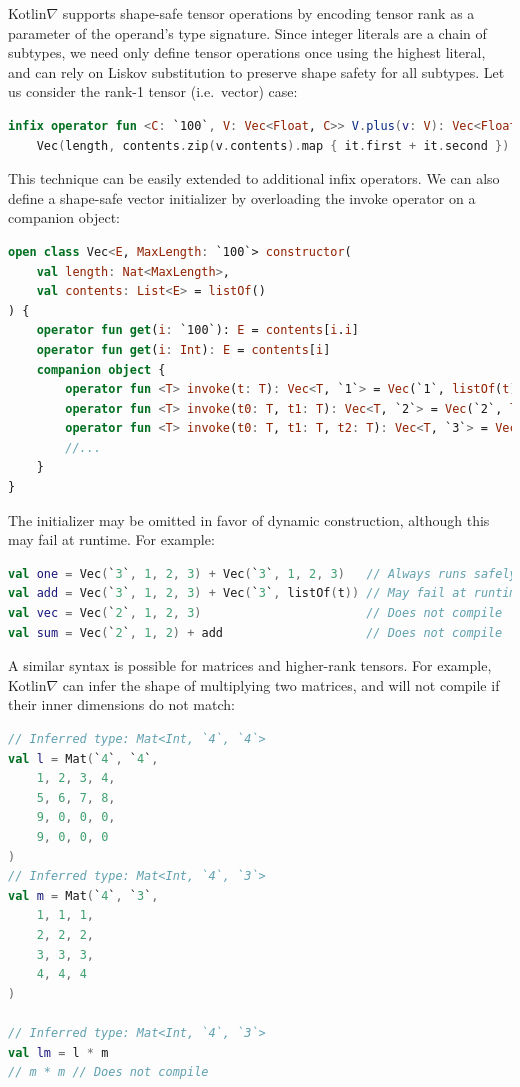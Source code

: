 \documentclass[12pt,initial,twoside,maitrise]{dms}
\numberwithin{equation}{section}
\numberwithin{table}{chapter}
\numberwithin{figure}{chapter}
\begin{document}
Kotlin$\nabla$ supports shape-safe tensor operations by encoding tensor rank as a parameter of the operand’s type signature. Since integer literals are a chain of subtypes, we need only define tensor operations once using the highest literal, and can rely on Liskov substitution to preserve shape safety for all subtypes. Let us consider the rank-1 tensor (i.e.\ vector) case:

\begin{lstlisting}[language=Kotlin]
infix operator fun <C: `100`, V: Vec<Float, C>> V.plus(v: V): Vec<Float, C> =
    Vec(length, contents.zip(v.contents).map { it.first + it.second })
\end{lstlisting}

\noindent This technique can be easily extended to additional infix operators. We can also define a shape-safe vector initializer by overloading the invoke operator on a companion object:

\begin{lstlisting}[language=Kotlin]
open class Vec<E, MaxLength: `100`> constructor(
    val length: Nat<MaxLength>,
    val contents: List<E> = listOf()
) {
    operator fun get(i: `100`): E = contents[i.i]
    operator fun get(i: Int): E = contents[i]
    companion object {
        operator fun <T> invoke(t: T): Vec<T, `1`> = Vec(`1`, listOf(t))
        operator fun <T> invoke(t0: T, t1: T): Vec<T, `2`> = Vec(`2`, listOf(t0, t1))
        operator fun <T> invoke(t0: T, t1: T, t2: T): Vec<T, `3`> = Vec(`3`, listOf(t0, t1, t2))
        //...
    }
}
\end{lstlisting}

The initializer may be omitted in favor of dynamic construction, although this may fail at runtime. For example:

\begin{lstlisting}[language=Kotlin]
val one = Vec(`3`, 1, 2, 3) + Vec(`3`, 1, 2, 3)   // Always runs safely
val add = Vec(`3`, 1, 2, 3) + Vec(`3`, listOf(t)) // May fail at runtime
val vec = Vec(`2`, 1, 2, 3)                       // Does not compile
val sum = Vec(`2`, 1, 2) + add                    // Does not compile
\end{lstlisting}

A similar syntax is possible for matrices and higher-rank tensors. For example, Kotlin$\nabla$ can infer the shape of multiplying two matrices, and will not compile if their inner dimensions do not match:

\begin{lstlisting}[language=Kotlin]
// Inferred type: Mat<Int, `4`, `4`>
val l = Mat(`4`, `4`,
    1, 2, 3, 4,
    5, 6, 7, 8,
    9, 0, 0, 0,
    9, 0, 0, 0
)
// Inferred type: Mat<Int, `4`, `3`>
val m = Mat(`4`, `3`,
    1, 1, 1,
    2, 2, 2,
    3, 3, 3,
    4, 4, 4
)

// Inferred type: Mat<Int, `4`, `3`>
val lm = l * m
// m * m // Does not compile
\end{lstlisting}
\end{document}
